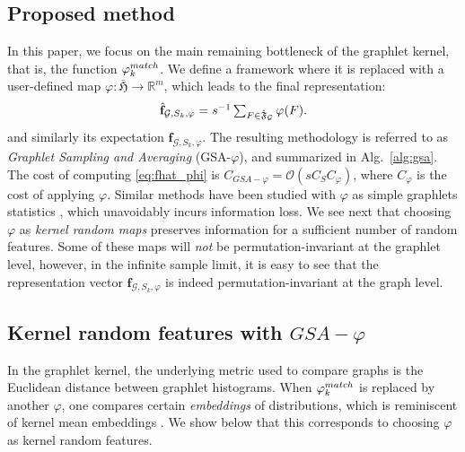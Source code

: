 \documentclass{article}
\begin{document}
\subsection{Proposed method}
\label{sec:algo}
In this paper, we focus on the main remaining bottleneck of the graphlet kernel, that is, the function $\varphi^{match}_k$. We define a framework where it is replaced with a user-defined map $\varphi: \bar{\mathfrak{H}} \to \mathbb{R}^m$, which leads to the final representation:
\begin{align}
	\label{eq:fhat_phi}
	\mathsmaller{\hat{\mathbf{f}}_{\mathcal{G},S_k,\varphi} =s^{-1}\sum_{F\in\hat{\mathfrak{F}}_\G} \varphi(F).}
\end{align}
and similarly its expectation $\mathbf{f}_{\mathcal{G},S_k,\varphi}$.
The resulting methodology is referred to as \emph{Graphlet Sampling and Averaging} (GSA-$\varphi$), and summarized in Alg.~\ref{alg:gsa}. The cost of computing \eqref{eq:fhat_phi} is $C_{GSA-\varphi}= \mathcal{O}\left(s C_S C_{\varphi}\right)$, where $C_{\varphi}$ is the cost of applying $\varphi$.
%
%
Similar methods have been studied with $\varphi$ as simple graphlets statistics \cite{Dutta2018}, which unavoidably incurs information loss. We see next that choosing $\varphi$ as \emph{kernel random maps} preserves information for a sufficient number of random features. Some of these maps will \emph{not} be permutation-invariant at the graphlet level, however, in the infinite sample limit, it is easy to see that the representation vector $\mathbf{f}_{\mathcal{G},S_k,\varphi}$ is indeed permutation-invariant at the graph level.

\subsection{Kernel random features with $GSA-\varphi$} 
\label{sec:MMD}

In the graphlet kernel, the underlying metric used to compare graphs is the Euclidean distance between graphlet histograms. When $\varphi^{match}_k$ is replaced by another $\varphi$, one compares certain \emph{embeddings} of distributions, which is reminiscent of kernel mean embeddings \cite{Gretton2007}. We show below that this corresponds to choosing $\varphi$ as kernel random features.
\end{document}
